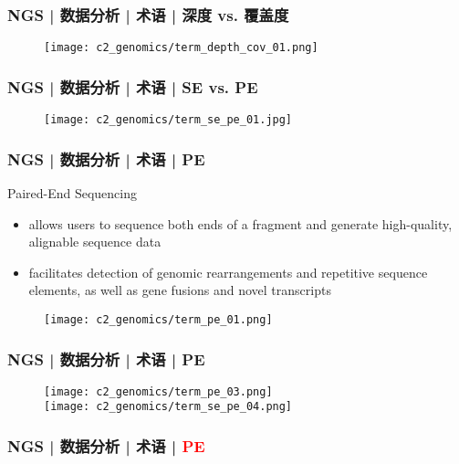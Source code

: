 \begin{frame}
  \frametitle{NGS | 数据分析 | 术语 | 深度 vs. 覆盖度}
  \begin{figure}
    \centering
    \texttt{[image: c2\_genomics/term\_depth\_cov\_01.png]}
  \end{figure}
\end{frame}

\begin{frame}
  \frametitle{NGS | 数据分析 | 术语 | SE vs. PE}
  \begin{figure}
    \centering
    \texttt{[image: c2\_genomics/term\_se\_pe\_01.jpg]}
  \end{figure}
\end{frame}

\begin{frame}
  \frametitle{NGS | 数据分析 | 术语 | PE}
  \begin{block}{Paired-End Sequencing}
    \begin{itemize}
      \item allows users to sequence both ends of a fragment and generate high-quality, alignable sequence data
      \item facilitates detection of genomic rearrangements and repetitive sequence elements, as well as gene fusions and novel transcripts
    \end{itemize}
  \end{block}
  \begin{figure}
    \centering
    \texttt{[image: c2\_genomics/term\_pe\_01.png]}
  \end{figure}
\end{frame}

\begin{frame}
  \frametitle{NGS | 数据分析 | 术语 | PE}
  \begin{figure}
    \centering
    \texttt{[image: c2\_genomics/term\_pe\_03.png]}\\
    \vspace{1em}
    \texttt{[image: c2\_genomics/term\_se\_pe\_04.png]}
  \end{figure}
\end{frame}

\begin{frame}
  \frametitle{NGS | 数据分析 | 术语 | \textcolor{red}{PE}}
  \begin{figure}
    \centering
    \\
    \vspace{1em}
  \end{figure}
\end{frame}

